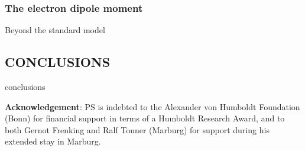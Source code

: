 \documentclass[12pt]{article}
\begin{document}
\subsubsection{\sffamily The electron dipole moment}
Beyond the standard model

\subsection{\sffamily \large CONCLUSIONS}
conclusions

{\footnotesize
{\bf Acknowledgement}: PS is indebted to the Alexander von Humboldt Foundation (Bonn) for financial support 
in terms of a Humboldt Research Award, and to both Gernot Frenking and 
Ralf Tonner (Marburg) for support during his extended stay in Marburg.}



\end{document}

